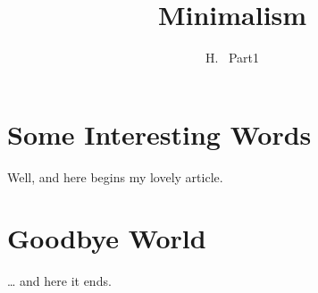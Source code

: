 \documentclass[a4paper, 11pt]{article}
\author{H. ~Part1}
\title{Minimalism}
\begin{document}
\maketitle

\tableofcontents

\section{Some Interesting Words}
Well, and here begins my lovely article.

\section{Goodbye World}
\ldots{} and here it ends.
\end{document}
